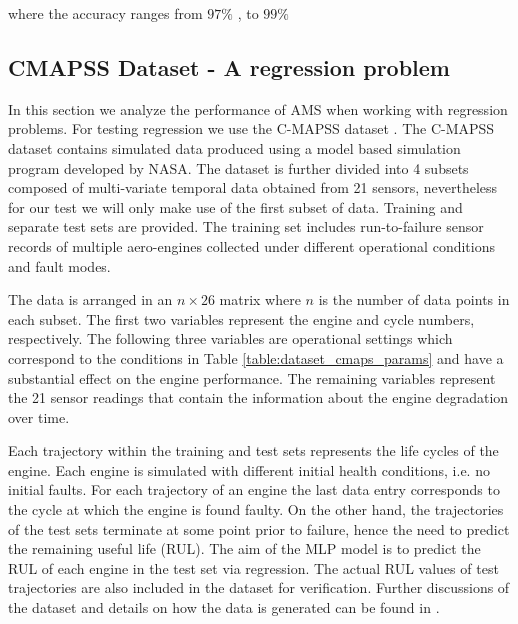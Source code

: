 \documentclass[journal]{IEEEtran}
\begin{document}
where the accuracy ranges from $97\%$ \cite{}, to $99\%$ \cite{deng2011}


\subsection{CMAPSS Dataset - A regression problem}

In this section we analyze the performance of AMS when working with regression problems. For testing regression we use the C-MAPSS dataset \cite{CMAPS2008}. The C-MAPSS dataset contains simulated data produced using a model based simulation program developed by NASA. The dataset is further divided into 4 subsets composed of multi-variate temporal data obtained from 21 sensors, nevertheless for our test we will only make use of the first subset of data. Training and separate test sets are provided. The training set includes run-to-failure sensor records of multiple aero-engines collected under different operational conditions and fault modes.

The data is arranged in an $n\times26$ matrix where $n$ is the number of data points in each subset. The first two variables represent the engine and cycle
numbers, respectively. The following three variables are operational settings which correspond to the conditions in Table \ref{table:dataset_cmaps_params} and have a
substantial effect on the engine performance. The remaining variables represent the 21 sensor readings that contain the information about the engine
degradation over time.

\begin{table}[!htb]
\begin{center}
\end{center}
\caption{CMAPSS dataset details.}
\label{table:dataset_cmaps_params}
\end{table}

Each trajectory within the training and test sets represents the life cycles of the engine. Each engine is simulated with different initial health conditions, i.e. no initial faults. For each trajectory of an engine the last data entry corresponds to the cycle at which the engine is found faulty. On the other hand, the trajectories of the test sets terminate at some point prior to failure, hence the need to predict the remaining useful life (RUL). The aim of the MLP model is to predict the RUL of each engine in the test set via regression. The actual RUL values of test trajectories are also included in the dataset for verification. Further discussions of the dataset and details on how the data is generated can be found in \cite{Saxena2008}.
\end{document}
